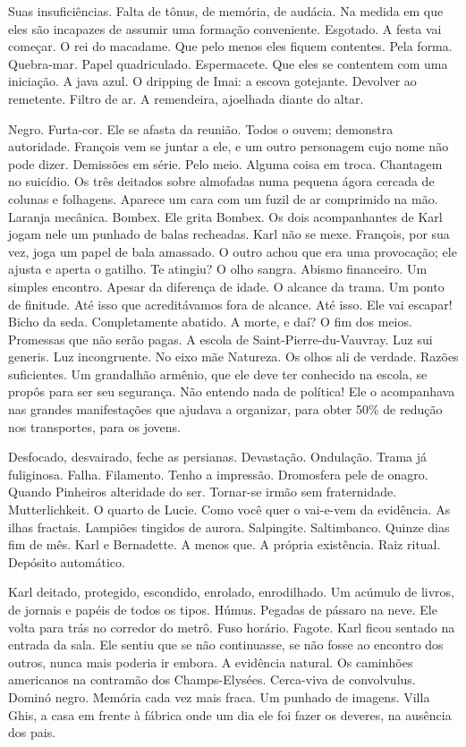 Suas insuficiências. Falta de tônus, de memória, de audácia. Na medida
em que eles são incapazes de assumir uma formação conveniente. Esgotado.
A festa vai começar. O rei do macadame. Que pelo menos eles fiquem
contentes. Pela forma. Quebra-mar. Papel quadriculado. Espermacete. Que
eles se contentem com uma iniciação. A java azul. O dripping de Imai: a
escova gotejante. Devolver ao remetente. Filtro de ar. A remendeira,
ajoelhada diante do altar.

Negro. Furta-cor. Ele se afasta da reunião. Todos o ouvem; demonstra
autoridade. François vem se juntar a ele, e um outro personagem cujo
nome não pode dizer. Demissões em série. Pelo meio. Alguma coisa em
troca. Chantagem no suicídio. Os três deitados sobre almofadas numa
pequena ágora cercada de colunas e folhagens. Aparece um cara com um
fuzil de ar comprimido na mão. Laranja mecânica. Bombex. Ele grita
Bombex. Os dois acompanhantes de Karl jogam nele um punhado de balas
recheadas. Karl não se mexe. François, por sua vez, joga um papel de
bala amassado. O outro achou que era uma provocação; ele ajusta e aperta
o gatilho. Te atingiu? O olho sangra. Abismo financeiro. Um simples
encontro. Apesar da diferença de idade. O alcance da trama. Um ponto de
finitude. Até isso que acreditávamos fora de alcance. Até isso. Ele vai
escapar! Bicho da seda. Completamente abatido. A morte, e daí? O fim dos
meios. Promessas que não serão pagas. A escola de
Saint-Pierre-du-Vauvray. Luz sui generis. Luz incongruente. No eixo mãe
Natureza. Os olhos ali de verdade. Razões suficientes. Um grandalhão
armênio, que ele deve ter conhecido na escola, se propôs para ser seu
segurança. Não entendo nada de política! Ele o acompanhava nas grandes
manifestações que ajudava a organizar, para obter 50\% de redução nos
transportes, para os jovens.

Desfocado, desvairado, feche as persianas. Devastação. Ondulação. Trama
já fuliginosa. Falha. Filamento. Tenho a impressão. Dromosfera pele de
onagro. Quando Pinheiros alteridade do ser. Tornar-se irmão sem
fraternidade. Mutterlichkeit. O quarto de Lucie. Como você quer o
vai-e-vem da evidência. As ilhas fractais. Lampiões tingidos de aurora.
Salpingite. Saltimbanco. Quinze dias fim de mês. Karl e Bernadette. A
menos que. A própria existência. Raiz ritual. Depósito automático.

Karl deitado, protegido, escondido, enrolado, enrodilhado. Um acúmulo de
livros, de jornais e papéis de todos os tipos. Húmus. Pegadas de pássaro
na neve. Ele volta para trás no corredor do metrô. Fuso horário. Fagote.
Karl ficou sentado na entrada da sala. Ele sentiu que se não
continuasse, se não fosse ao encontro dos outros, nunca mais poderia ir
embora. A evidência natural. Os caminhões americanos na contramão dos
Champs-Elysées. Cerca-viva de convolvulus. Dominó negro. Memória cada
vez mais fraca. Um punhado de imagens. Villa Ghis, a casa em frente à
fábrica onde um dia ele foi fazer os deveres, na ausência dos pais.

